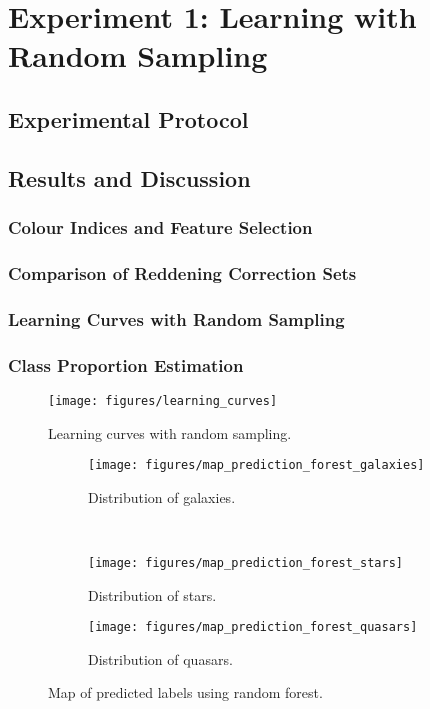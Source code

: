 
\chapter{Experiment 1: Learning with Random Sampling}
\label{cha:expt1}



\section{Experimental Protocol}
\label{sec:protocol1}



\section{Results and Discussion}
\label{sec:results1}

\subsection{Colour Indices and Feature Selection}

\subsection{Comparison of Reddening Correction Sets}

\subsection{Learning Curves with Random Sampling}

\subsection{Class Proportion Estimation}

\begin{figure}[tbp]
	\centering
	\texttt{[image: figures/learning\_curves]}
	\caption{Learning curves with random sampling.}
	\label{fig:learning}
\end{figure}



\begin{figure}[p]
	\centering
	\begin{subfigure}{\textwidth}
		\centering
		\texttt{[image: figures/map\_prediction\_forest\_galaxies]}
		\caption{Distribution of galaxies.}
		\label{fig:random1}
	\end{subfigure}\\
	\begin{subfigure}{\textwidth}
		\centering
		\texttt{[image: figures/map\_prediction\_forest\_stars]}
		\caption{Distribution of stars.}
		\label{fig:random2}
	\end{subfigure}
	\begin{subfigure}{\textwidth}
		\centering
		\texttt{[image: figures/map\_prediction\_forest\_quasars]}
		\caption{Distribution of quasars.}
		\label{fig:random3}
	\end{subfigure}
	\caption{Map of predicted labels using random forest.}
	\label{fig:random}
\end{figure}


